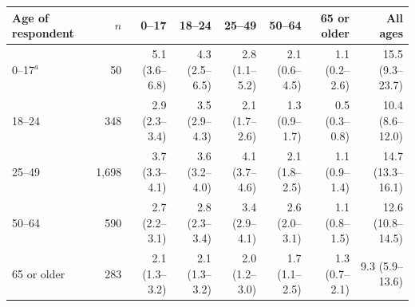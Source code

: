 \begin{tabular}{lrrrrrrr}
\toprule
Age of respondent & $n$ & 0--17 & 18--24 & 25--49 & 50--64 & 65 or older & All ages \\
\midrule
0--17$^{a}$ & 50 & 5.1 (3.6--6.8) & 4.3 (2.5--6.5) & 2.8 (1.1--5.2) & 2.1 (0.6--4.5) & 1.1 (0.2--2.6) & 15.5 (9.3--23.7) \\
18--24 & 348 & 2.9 (2.3--3.4) & 3.5 (2.9--4.3) & 2.1 (1.7--2.6) & 1.3 (0.9--1.7) & 0.5 (0.3--0.8) & 10.4 (8.6--12.0) \\
25--49 & 1,698 & 3.7 (3.3--4.1) & 3.6 (3.2--4.0) & 4.1 (3.7--4.6) & 2.1 (1.8--2.5) & 1.1 (0.9--1.4) & 14.7 (13.3--16.1) \\
50--64 & 590 & 2.7 (2.2--3.1) & 2.8 (2.3--3.4) & 3.4 (2.9--4.1) & 2.6 (2.0--3.1) & 1.1 (0.8--1.5) & 12.6 (10.8--14.5) \\
65 or older & 283 & 2.1 (1.3--3.2) & 2.1 (1.3--3.2) & 2.0 (1.2--3.0) & 1.7 (1.1--2.5) & 1.3 (0.7--2.1) & 9.3 (5.9--13.6) \\
\bottomrule
\end{tabular}
